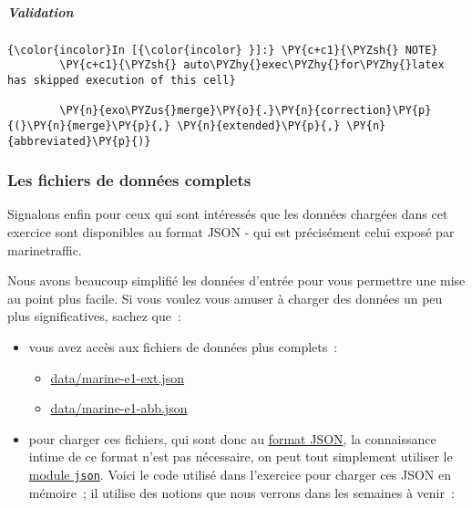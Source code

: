     \hypertarget{validation}{%
\subparagraph{Validation}\label{validation}}

    \begin{Verbatim}[commandchars=\\\{\},frame=single,framerule=0.3mm,rulecolor=\color{cellframecolor}]
{\color{incolor}In [{\color{incolor} }]:} \PY{c+c1}{\PYZsh{} NOTE}
        \PY{c+c1}{\PYZsh{} auto\PYZhy{}exec\PYZhy{}for\PYZhy{}latex has skipped execution of this cell}
        
        \PY{n}{exo\PYZus{}merge}\PY{o}{.}\PY{n}{correction}\PY{p}{(}\PY{n}{merge}\PY{p}{,} \PY{n}{extended}\PY{p}{,} \PY{n}{abbreviated}\PY{p}{)}
\end{Verbatim}


    \hypertarget{les-fichiers-de-donnuxe9es-complets}{%
\subsubsection{Les fichiers de données
complets}\label{les-fichiers-de-donnuxe9es-complets}}

    Signalons enfin pour ceux qui sont intéressés que les données chargées
dans cet exercice sont disponibles au format JSON - qui est précisément
celui exposé par marinetraffic.

Nous avons beaucoup simplifié les données d'entrée pour vous permettre
une mise au point plus facile. Si vous voulez vous amuser à charger des
données un peu plus significatives, sachez que~:

\begin{itemize}
\tightlist
\item
  vous avez accès aux fichiers de données plus complets~:

  \begin{itemize}
  \tightlist
  \item
    \url{data/marine-e1-ext.json}
  \item
    \url{data/marine-e1-abb.json}
  \end{itemize}
\item
  pour charger ces fichiers, qui sont donc au
  \href{http://en.wikipedia.org/wiki/JSON}{format JSON}, la connaissance
  intime de ce format n'est pas nécessaire, on peut tout simplement
  utiliser le \href{https://docs.python.org/3/library/json.html}{module
  \texttt{json}}. Voici le code utilisé dans l'exercice pour charger ces
  JSON en mémoire~; il utilise des notions que nous verrons dans les
  semaines à venir~:
\end{itemize}

